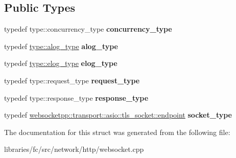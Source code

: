 \subsection*{Public Types}
\begin{DoxyCompactItemize}
\item 
\mbox{\label{structfc_1_1http_1_1detail_1_1asio__tls__with__stub__log_1_1transport__config_abc5b75dbe46831195e265621aaf82e7c}} 
typedef type\+::concurrency\+\_\+type {\bfseries concurrency\+\_\+type}
\item 
\mbox{\label{structfc_1_1http_1_1detail_1_1asio__tls__with__stub__log_1_1transport__config_a20c20ff7835bc794e3adeb3615899a2a}} 
typedef \mbox{\hyperlink{classwebsocketpp_1_1log_1_1stub}{type\+::alog\+\_\+type}} {\bfseries alog\+\_\+type}
\item 
\mbox{\label{structfc_1_1http_1_1detail_1_1asio__tls__with__stub__log_1_1transport__config_aeca6830c56529f05e2da3a13fe1463b2}} 
typedef \mbox{\hyperlink{structfc_1_1http_1_1detail_1_1asio__with__stub__log_a5be4919ddde517477acb81e13cc3826d}{type\+::elog\+\_\+type}} {\bfseries elog\+\_\+type}
\item 
\mbox{\label{structfc_1_1http_1_1detail_1_1asio__tls__with__stub__log_1_1transport__config_a4080f3f6f1a3fbe415f3a7a102a62fc7}} 
typedef type\+::request\+\_\+type {\bfseries request\+\_\+type}
\item 
\mbox{\label{structfc_1_1http_1_1detail_1_1asio__tls__with__stub__log_1_1transport__config_ab288034c279a673d310c79c94bda2474}} 
typedef type\+::response\+\_\+type {\bfseries response\+\_\+type}
\item 
\mbox{\label{structfc_1_1http_1_1detail_1_1asio__tls__with__stub__log_1_1transport__config_aa949cbea45c52b0a0db014b2fc551355}} 
typedef \mbox{\hyperlink{classwebsocketpp_1_1transport_1_1asio_1_1tls__socket_1_1endpoint}{websocketpp\+::transport\+::asio\+::tls\+\_\+socket\+::endpoint}} {\bfseries socket\+\_\+type}
\end{DoxyCompactItemize}


The documentation for this struct was generated from the following file\+:\begin{DoxyCompactItemize}
\item 
libraries/fc/src/network/http/websocket.\+cpp\end{DoxyCompactItemize}

